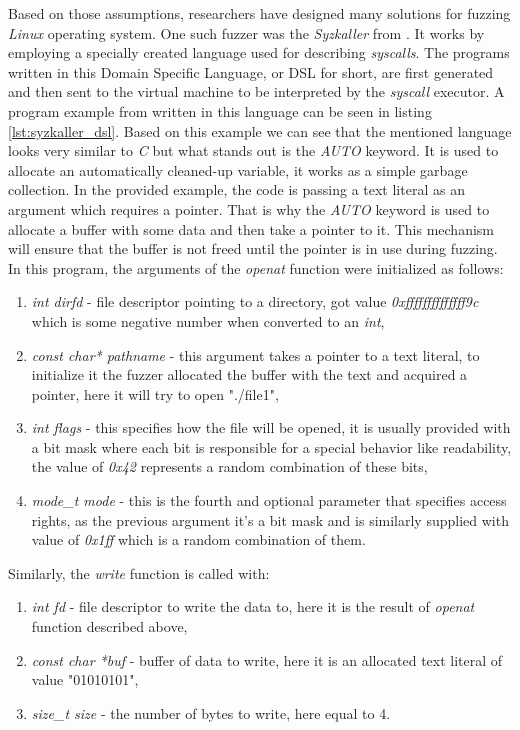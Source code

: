 Based on those assumptions, researchers have designed many solutions for fuzzing \textit{Linux} operating system. One such fuzzer was the \textit{Syzkaller} from \cite{syzkaller}. It works by employing a specially created language used for describing \textit{syscalls}. The programs written in this Domain Specific Language, or DSL for short, are first generated and then sent to the virtual machine to be interpreted by the \textit{syscall} executor. A program example from \cite{syzkaller_repo} written in this language can be seen in listing \ref{lst:syzkaller_dsl}. Based on this example we can see that the mentioned language looks very similar to \textit{C} but what stands out is the \textit{AUTO} keyword. It is used to allocate an automatically cleaned-up variable, it works as a simple garbage collection. In the provided example, the code is passing a text literal as an argument which requires a pointer. That is why the \textit{AUTO} keyword is used to allocate a buffer with some data and then take a pointer to it. This mechanism will ensure that the buffer is not freed until the pointer is in use during fuzzing. In this program, the arguments of the \textit{openat} function were initialized as follows:
\begin{enumerate}
    \item \textit{int dirfd} - file descriptor pointing to a directory, got value \textit{0xffffffffffffff9c} which is some negative number when converted to an \textit{int},
    \item \textit{const char* pathname} - this argument takes a pointer to a text literal, to initialize it the fuzzer allocated the buffer with the text and acquired a pointer, here it will try to open "./file1",
    \item \textit{int flags} - this specifies how the file will be opened, it is usually provided with a bit mask where each bit is responsible for a special behavior like readability, the value of \textit{0x42} represents a random combination of these bits,
    \item \textit{mode\_t mode} - this is the fourth and optional parameter that specifies access rights, as the previous argument it's a bit mask and is similarly supplied with value of \textit{0x1ff} which is a random combination of them.
\end{enumerate}
Similarly, the \textit{write} function is called with:
\begin{enumerate}
    \item \textit{int fd} - file descriptor to write the data to, here it is the result of \textit{openat} function described above,
    \item \textit{const char *buf} - buffer of data to write, here it is an allocated text literal of value "01010101",
    \item \textit{size\_t size} - the number of bytes to write, here equal to 4.
\end{enumerate}

